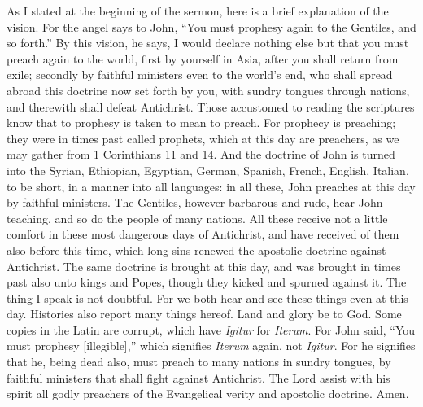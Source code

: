 As I stated at the beginning of the sermon, here is a brief explanation of the vision. For the angel says to John, “You must prophesy again to the Gentiles, and so forth.” By this vision, he says, I would declare nothing else but that you must preach again to the world, first by yourself in Asia, after you shall return from exile; secondly by faithful ministers even to the world’s end, who shall spread abroad this doctrine now set forth by you, with sundry tongues through nations, and therewith shall defeat Antichrist. Those accustomed to reading the scriptures know that to prophesy is taken to mean to preach. For prophecy is preaching; they were in times past called prophets, which at this day are preachers, as we may gather from 1 Corinthians 11 and 14. And the doctrine of John is turned into the Syrian, Ethiopian, Egyptian, German, Spanish, French, English, Italian, to be short, in a manner into all languages: in all these, John preaches at this day by faithful ministers. The Gentiles, however barbarous and rude, hear John teaching, and so do the people of many nations. All these receive not a little comfort in these most dangerous days of Antichrist, and have received of them also before this time, which long sins renewed the apostolic doctrine against Antichrist. The same doctrine is brought at this day, and was brought in times past also unto kings and Popes, though they kicked and spurned against it. The thing I speak is not doubtful. For we both hear and see these things even at this day. Histories also report many things hereof. Land and glory be to God. Some copies in the Latin are corrupt, which have \textit{Igitur} for \textit{Iterum}. For John said, “You must prophesy [illegible],” which signifies \textit{Iterum} again, not \textit{Igitur}. For he signifies that he, being dead also, must preach to many nations in sundry tongues, by faithful ministers that shall fight against Antichrist. The Lord assist with his spirit all godly preachers of the Evangelical verity and apostolic doctrine. Amen.
